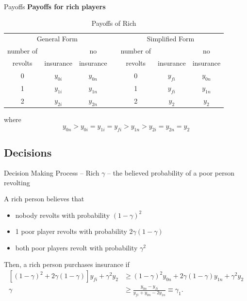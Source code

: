 \documentclass[mathserif]{beamer}
\begin{document}
	\begin{frame}{Payoffs}
		\textbf{Payoffs for rich players}
		
		\begin{adjustwidth*}{-1cm}{-1cm}
		\begin{table}[!htbp]
			\caption{Payoffs of Rich}
			\label{rpayoffs}
			\centering
			\begin{tabular}{|c||c|c|c|c||c|c|}
				\multicolumn{3}{c}{General Form} &
				\multicolumn{1}{c}{} &
				\multicolumn{3}{c}{Simplified Form}\\
				\cline{1-3}\cline{5-7}
				number of & & no & & number of & & no\\
				revolts & insurance & insurance && revolts & 
				insurance & insurance\\
				\cline{1-3}\cline{5-7}
				0 & $y_{0i}$ & $y_{0n}$ && 0 & $y_{fi}$ & $y_{0n}$\\
				\cline{1-3}\cline{5-7}
				1 & $y_{1i}$ & $y_{1n}$ && 1 & $y_{fi}$ & $y_{1n}$\\
				\cline{1-3}\cline{5-7}
				2 & $y_{2i}$ & $y_{2n}$ && 2 & $y_2$ & $y_2$\\
				\cline{1-3}\cline{5-7}
			\end{tabular}
		\end{table}
	\end{adjustwidth*}
	
	where 
	 $$y_{0n} > y_{0i}=y_{1i}=y_{fi} > y_{1n} > y_{2i}=y_{2n}=y_2$$
	\end{frame}
	
	\subsection{Decisions}
	\begin{frame}{Decision Making Process -- Rich}
		$\gamma$ -- the believed probability of a poor person revolting
		
		\pause
		A rich person believes that
		\begin{itemize}[<+->]
			\item nobody revolts with probability $(1-\gamma)^2$
			\item 1 poor player revolts with probability $2\gamma(1-\gamma)$
			\item both poor players revolt with probability $\gamma^2$
		\end{itemize}
		\pause
		Then, a rich person purchases insurance if
		\begin{align*}
			\left[(1-\gamma)^2 + 2\gamma(1-\gamma)\right]y_{fi} + \gamma^2y_2 &\geq 
			(1-\gamma)^2y_{0n} + 2\gamma(1-\gamma)y_{1n} + \gamma^2y_2\\
			\gamma &\geq \frac{y_{0n} - y_{fi}}{y_{fi} + y_{0n} -2y_{1n}} \equiv 
			\gamma_1.
		\end{align*}
	\end{frame}
	
\end{document}
